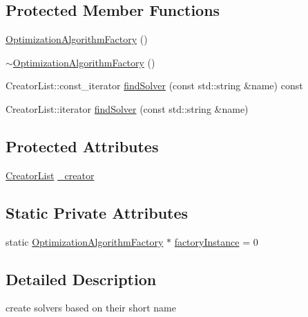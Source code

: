 \subsection*{Protected Member Functions}
\begin{DoxyCompactItemize}
\item 
\mbox{\hyperlink{classg2o_1_1_optimization_algorithm_factory_ac0e56515170544768e4cad9f2fede55c}{Optimization\+Algorithm\+Factory}} ()
\item 
\mbox{\hyperlink{classg2o_1_1_optimization_algorithm_factory_a172879a5ecbbe9ec7c4771c87aef1c57}{$\sim$\+Optimization\+Algorithm\+Factory}} ()
\item 
Creator\+List\+::const\+\_\+iterator \mbox{\hyperlink{classg2o_1_1_optimization_algorithm_factory_a33368953cc13fc69bad64ce440d90a39}{find\+Solver}} (const std\+::string \&name) const
\item 
Creator\+List\+::iterator \mbox{\hyperlink{classg2o_1_1_optimization_algorithm_factory_a75857fd4977318d51412f4ebae20157d}{find\+Solver}} (const std\+::string \&name)
\end{DoxyCompactItemize}
\subsection*{Protected Attributes}
\begin{DoxyCompactItemize}
\item 
\mbox{\hyperlink{classg2o_1_1_optimization_algorithm_factory_a3ed210b94bf09b47e30d07da3766b4ec}{Creator\+List}} \mbox{\hyperlink{classg2o_1_1_optimization_algorithm_factory_a1d7f67d60df0d0b26a7694dcea4879db}{\+\_\+creator}}
\end{DoxyCompactItemize}
\subsection*{Static Private Attributes}
\begin{DoxyCompactItemize}
\item 
static \mbox{\hyperlink{classg2o_1_1_optimization_algorithm_factory}{Optimization\+Algorithm\+Factory}} $\ast$ \mbox{\hyperlink{classg2o_1_1_optimization_algorithm_factory_a688a34932a4e4c94e122dd81f35bb7ca}{factory\+Instance}} = 0
\end{DoxyCompactItemize}


\subsection{Detailed Description}
create solvers based on their short name 

